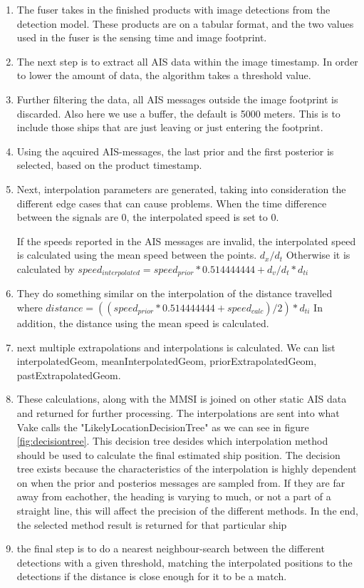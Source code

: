 \begin{enumerate}
	\item The fuser takes in the finished products with image detections from the detection model. These products are on a tabular format, and the two values used in the fuser is the sensing time and image footprint. 
	\item The next step is to extract all AIS data within the image timestamp. In order to lower the amount of data, the algorithm takes a threshold value. 
	\item Further filtering the data, all AIS messages outside the image footprint is discarded. Also here we use a buffer, the default is 5000 meters. This is to include those ships that are just leaving or just entering the footprint. 
	\item Using the aqcuired AIS-messages, the last prior and the first posterior is selected, based on the product timestamp. 
	\item Next, interpolation parameters are generated, taking into consideration the different edge cases that can cause problems. When the time difference between the signals are 0, the interpolated speed is set to 0.
	
	If the speeds reported in the AIS messages are invalid, the interpolated speed is calculated using the mean speed between the points. $d_x/d_t$ Otherwise it is calculated by $speed_{interpolated} = speed_{prior}*0.514444444 + d_v/d_t * d_{ti}$

	\item They do something similar on the interpolation of the distance travelled where $distance=((speed_{prior}*0.514444444 + speed_{calc})/2)*d_{ti}$ 
	In addition, the distance using the mean speed is calculated.
	
	\item next multiple extrapolations and interpolations is calculated. We can list interpolatedGeom, meanInterpolatedGeom, priorExtrapolatedGeom,  pastExtrapolatedGeom. 
	\item These calculations, along with the MMSI is joined on other static AIS data and returned for further processing. The interpolations are sent into what Vake calls the "LikelyLocationDecisionTree" as we can see in figure \ref{fig:decisiontree}. This decision tree desides which interpolation method should be used to calculate the final estimated ship position. The decision tree exists because the characteristics of the interpolation is highly dependent on when the prior and posterios messages are sampled from. If they are far away from eachother, the heading is varying to much, or not a part of a straight line, this will affect the precision of the different methods. In the end, the selected method result is returned for that particular ship
	\item the final step is to do a nearest neighbour-search between the different detections with a given threshold, matching the interpolated positions to the detections if the distance is close enough for it to be a match.   
\end{enumerate}	

